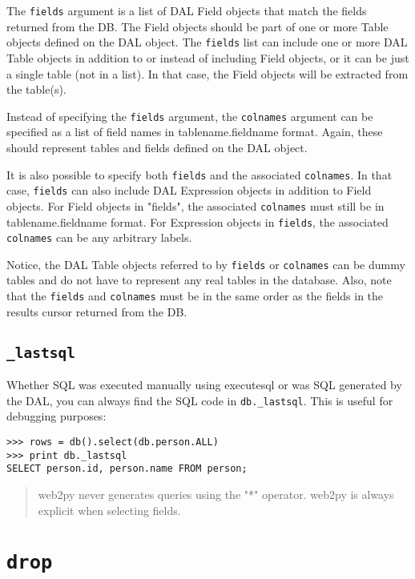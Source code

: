 \documentclass[justified,sixbynine,notoc]{tufte-book}
\def\ft{\small\tt}
\def\inxx#1{\index{#1}}
\begin{document}
\begin{fullwidth}
The {\ft fields} argument is a list of DAL Field objects that match the
fields returned from the DB. The Field objects should be part of one or
more Table objects defined on the DAL object. The {\ft fields} list can
include one or more DAL Table objects in addition to or instead of
including Field objects, or it can be just a single table (not in a
list). In that case, the Field objects will be extracted from the
table(s).

Instead of specifying the {\ft fields} argument, the {\ft colnames} argument
can be specified as a list of field names in tablename.fieldname format.
Again, these should represent tables and fields defined on the DAL
object.

It is also possible to specify both {\ft fields} and the associated
{\ft colnames}. In that case, {\ft fields} can also include DAL Expression
objects in addition to Field objects. For Field objects in "fields",
the associated {\ft colnames} must still be in tablename.fieldname format.
For Expression objects in {\ft fields}, the associated {\ft colnames} can
be any arbitrary labels.

Notice, the DAL Table objects referred to by {\ft fields} or {\ft colnames} can
be dummy tables and do not have to represent any real tables in the
database. Also, note that the {\ft fields} and {\ft colnames} must be in the
same order as the fields in the results cursor returned from the DB.

\goodbreak\subsection{{\ft \_lastsql}}

Whether SQL was executed manually using executesql or was SQL generated by the DAL, you can always find the SQL code in {\ft db.\_lastsql}. This is useful for debugging purposes:

\inxx{\_lastdb}
\begin{lstlisting}
>>> rows = db().select(db.person.ALL)
>>> print db._lastsql
SELECT person.id, person.name FROM person;
\end{lstlisting}

\begin{quote}web2py never generates queries using the "*" operator. web2py is always explicit when selecting fields.\end{quote}
\goodbreak\section{{\ft drop}}


\end{fullwidth}
\end{document}
